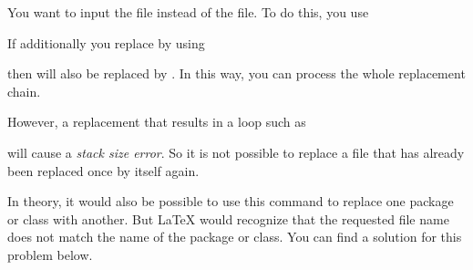 \begin{Example}
  You want to input the  file instead of the
   file. To do this, you use
\begin{lstcode}
\end{lstcode}
  If additionally you replace  by
   using
\begin{lstcode}
\end{lstcode}
  then  will also be replaced by
  . In this way, you can process the whole
  replacement chain.

  However, a replacement that results in a loop such as
\begin{lstcode}
\end{lstcode}
  will cause a \emph{stack size error}. So it is not possible to replace
  a file that has already been replaced once by itself again.
\end{Example}

In theory, it would also be possible to use this command to replace one
package or class with another. But \LaTeX{} would recognize that the requested
file name does not match the name of the package or class. You can find a
solution for this problem below.%
\EndIndexGroup



